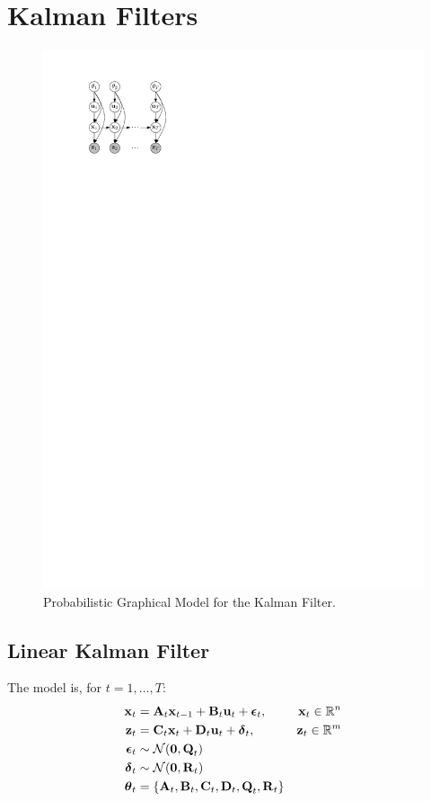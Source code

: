 \section{Kalman Filters}
\begin{figure}[!htb]
\centering
\includegraphics[scale=1]{models/kf/figures/kf}
\caption{Probabilistic Graphical Model for the Kalman Filter.}
\label{fig:models/kf/figures/kf}
\end{figure}

\subsection{Linear Kalman Filter}
The model is, for $t = 1, \dotsc, T$:
\begin{align}
	\vec x_t 		&= \vec A_t \vec x_{t - 1} + \vec B_t \vec u_t + \vec\epsilon_t, & \vec x_t \in \mathbb R^n\\
	\vec z_t		&= \vec C_t \vec x_t + \vec D_t \vec u_t + \vec\delta_t, & \vec z_t \in \mathbb R^m\\
	\vec\epsilon_t	&\sim \Gauss(\vec 0, \vec Q_t) \\
	\vec\delta_t	&\sim \Gauss(\vec 0, \vec R_t) \\
	\vec\theta_t 	&= \{\vec A_t, \vec B_t, \vec C_t, \vec D_t, \vec Q_t, \vec R_t\}
\end{align}

